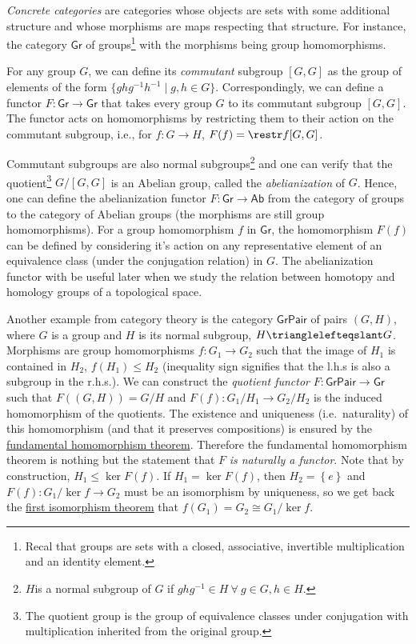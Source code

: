 \documentclass[english,letterpaper]{article}%
\numberwithin{equation}{section}
\numberwithin{figure}{section}
\numberwithin{table}{section}
\theoremstyle{definition}
\theoremstyle{definition}
\theoremstyle{definition}
\theoremstyle{plain}
\theoremstyle{plain}
\theoremstyle{plain}
\theoremstyle{plain}
\theoremstyle{remark}
\theoremstyle{remark}
\renewcommand{\leq}{\leqslant}
\begin{document}
\emph{Concrete categories} are categories whose objects are sets
with some additional structure and whose morphisms are maps respecting
that structure. For instance, the category $\mathsf{Gr}$ of groups\footnote{Recal that groups are sets with a closed, associative, invertible
multiplication and an identity element.} with the morphisms being group homomorphisms.
\begin{example}
For any group $G$, we can define its \emph{commutant} subgroup
$[G,G]$ as the group of elements of the form $\{ghg^{-1}h^{-1}\mid g,h\in G\}$.
Correspondingly, we can define a functor $F:\mathsf{Gr}\rightarrow\mathsf{Gr}$
that takes every group $G$ to its commutant subgroup $[G,G]$. The
functor acts on homomorphisms by restricting them to their action
on the commutant subgroup, i.e., for $f:G\rightarrow H$, $F(f)=\restr f{[G,G]}$.

Commutant subgroups are also normal subgroups\footnote{$H$is a normal subgroup of $G$ if $ghg^{-1}\in H~\forall~g\in G,h\in H$.}
and one can verify that the quotient\footnote{The quotient group is the group of equivalence classes under conjugation
with multiplication inherited from the original group.} $G/[G,G]$ is an Abelian group, called the \emph{abelianization}
of $G$. Hence, one can define the abelianization functor
$F:\mathsf{Gr}\rightarrow\mathsf{Ab}$ from the category of groups
to the category of Abelian groups (the morphisms are still group homomorphisms).
For a group homomorphism $f$ in $\mathsf{Gr}$, the homomorphism
$F(f)$ can be defined by considering it's action on any representative
element of an equivalence class (under the conjugation relation) in
$G$. The abelianization functor with be useful later when we study
the relation between homotopy and homology groups of a topological
space.
\end{example}
%
\begin{example}
\label{quotient functor}Another example from category theory is
the category $\mathsf{GrPair}$ of pairs $\left(G,H\right)$, where
$G$ is a group and $H$ is its normal subgroup, $H\trianglelefteqslant G$.
Morphisms are group homomorphisms $f:G_{1}\to G_{2}$ such that the
image of $H_{1}$ is contained in $H_{2}$, $f\left(H_{1}\right)\leq H_{2}$
(inequality sign signifies that the l.h.s is also a subgroup in the
r.h.s.). We can construct the \emph{quotient functor} $F:\mathsf{GrPair}\to\mathsf{Gr}$
such that $F\left(\left(G,H\right)\right)=G/H$ and $F\left(f\right):G_{1}/H_{1}\to G_{2}/H_{2}$
is the induced homomorphism of the quotients. The existence and uniqueness
(i.e.\ naturality) of this homomorphism (and that it preserves compositions)
is ensured by the \href{https://en.wikipedia.org/wiki/Fundamental_theorem_on_homomorphisms}{fundamental homomorphism theorem}.
Therefore the fundamental homomorphism theorem is nothing but the
statement that $F$\emph{ is naturally a functor}. Note that by
construction, $H_{1}\leq\ker F(f)$. If $H_{1}=\ker F\left(f\right)$,
then $H_{2}=\left\{ e\right\} $ and $F(f):G_{1}/\ker f\to G_{2}$
must be an isomorphism by uniqueness, so we get back the \href{https://en.wikipedia.org/wiki/Isomorphism_theorems\#First_isomorphism_theorem}{first isomorphism theorem}
that $f\left(G_{1}\right)=G_{2}\cong G_{1}/\ker f$.
\end{example}
\end{document}
